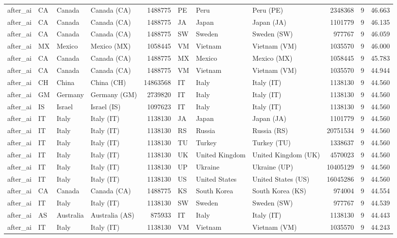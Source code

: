 \begin{tabular}{llllrlllrrr}
after\_ai & CA & Canada & Canada (CA) & 1488775 & PE & Peru & Peru (PE) & 2348368 & 9 & 46.663 \\
after\_ai & CA & Canada & Canada (CA) & 1488775 & JA & Japan & Japan (JA) & 1101779 & 9 & 46.135 \\
after\_ai & CA & Canada & Canada (CA) & 1488775 & SW & Sweden & Sweden (SW) & 977767 & 9 & 46.059 \\
after\_ai & MX & Mexico & Mexico (MX) & 1058445 & VM & Vietnam & Vietnam (VM) & 1035570 & 9 & 46.000 \\
after\_ai & CA & Canada & Canada (CA) & 1488775 & MX & Mexico & Mexico (MX) & 1058445 & 9 & 45.783 \\
after\_ai & CA & Canada & Canada (CA) & 1488775 & VM & Vietnam & Vietnam (VM) & 1035570 & 9 & 44.944 \\
after\_ai & CH & China & China (CH) & 14863568 & IT & Italy & Italy (IT) & 1138130 & 9 & 44.560 \\
after\_ai & GM & Germany & Germany (GM) & 2739820 & IT & Italy & Italy (IT) & 1138130 & 9 & 44.560 \\
after\_ai & IS & Israel & Israel (IS) & 1097623 & IT & Italy & Italy (IT) & 1138130 & 9 & 44.560 \\
after\_ai & IT & Italy & Italy (IT) & 1138130 & JA & Japan & Japan (JA) & 1101779 & 9 & 44.560 \\
after\_ai & IT & Italy & Italy (IT) & 1138130 & RS & Russia & Russia (RS) & 20751534 & 9 & 44.560 \\
after\_ai & IT & Italy & Italy (IT) & 1138130 & TU & Turkey & Turkey (TU) & 1338637 & 9 & 44.560 \\
after\_ai & IT & Italy & Italy (IT) & 1138130 & UK & United Kingdom & United Kingdom (UK) & 4570023 & 9 & 44.560 \\
after\_ai & IT & Italy & Italy (IT) & 1138130 & UP & Ukraine & Ukraine (UP) & 10405129 & 9 & 44.560 \\
after\_ai & IT & Italy & Italy (IT) & 1138130 & US & United States & United States (US) & 16045286 & 9 & 44.560 \\
after\_ai & CA & Canada & Canada (CA) & 1488775 & KS & South Korea & South Korea (KS) & 974004 & 9 & 44.554 \\
after\_ai & IT & Italy & Italy (IT) & 1138130 & SW & Sweden & Sweden (SW) & 977767 & 9 & 44.539 \\
after\_ai & AS & Australia & Australia (AS) & 875933 & IT & Italy & Italy (IT) & 1138130 & 9 & 44.443 \\
after\_ai & IT & Italy & Italy (IT) & 1138130 & VM & Vietnam & Vietnam (VM) & 1035570 & 9 & 44.243 \\

\end{tabular}
